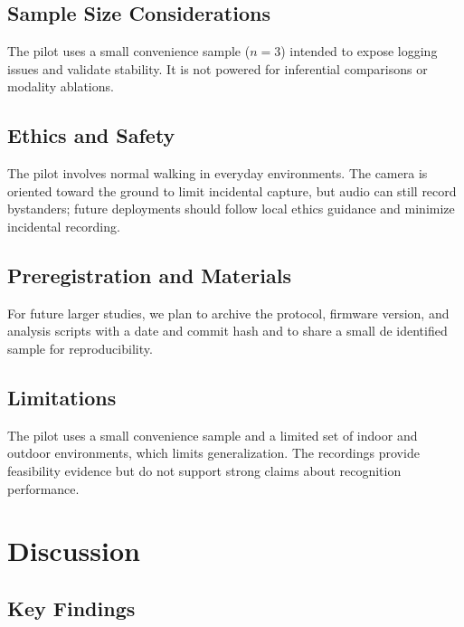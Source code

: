 \documentclass[manuscript,review,anonymous]{acmart}
\begin{document}
\subsection{Sample Size Considerations}
The pilot uses a small convenience sample (\(n=3\)) intended to expose logging issues and validate stability. It is not powered for inferential comparisons or modality ablations.

\subsection{Ethics and Safety}
The pilot involves normal walking in everyday environments. The camera is oriented toward the ground to limit incidental capture, but audio can still record bystanders; future deployments should follow local ethics guidance and minimize incidental recording.

\subsection{Preregistration and Materials}
For future larger studies, we plan to archive the protocol, firmware version, and analysis scripts with a date and commit hash and to share a small de identified sample for reproducibility.

\subsection{Limitations}
The pilot uses a small convenience sample and a limited set of indoor and outdoor environments, which limits generalization. The recordings provide feasibility evidence but do not support strong claims about recognition performance.


\section{Discussion}

\subsection{Key Findings}
\end{document}
